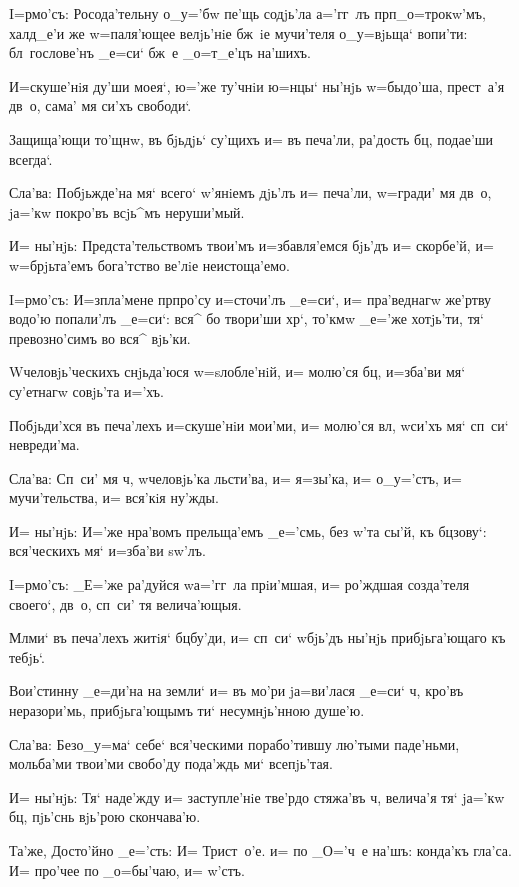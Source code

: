
I=рмо'съ: Росода'тельну о_у='бw пе'щь содjь'ла 
а='гг~лъ прп _о=трокw'мъ, халд_е'и же w=паля'ющее 
велjь'нiе бж~iе мучи'теля о_у=вjьща` вопи'ти: 
бл~гослове'нъ _е=си` бж~е _о=т_е'цъ на'шихъ.

И=скуше'нiя ду'ши моея`, ю='же ту'чнiи ю=нцы` ны'нjь 
w=быдо'ша, прест~а'я дв~о, сама' мя си'хъ свободи`.

Защища'ющи то'щнw, въ бjьдjь` су'щихъ и= въ печа'ли, 
ра'дость бц, подае'ши всегда`.

Сла'ва: Побjьжде'на мя` всего` w'янiемъ дjь'лъ и= 
печа'ли, w=гради' мя дв~о, jа='кw покро'въ всjь^мъ 
неруши'мый.

И= ны'нjь: Предста'тельствомъ твои'мъ и=збавля'емся 
бjь'дъ и= скорбе'й, и= w=брjьта'емъ бога'тство ве'лiе 
неистоща'емо.


I=рмо'съ: И=з\ъ пла'мене прп ро'су и=сточи'лъ 
_е=си`, и= пра'веднагw же'ртву водо'ю попали'лъ _е=си`: 
вся^ бо твори'ши хр`, то'кмw _е='же хотjь'ти, тя` 
превозно'симъ во вся^ вjь'ки.

W\т человjь'ческихъ снjьда'юся w=sлобле'нiй, и= 
молю'ся бц, и=зба'ви мя` су'етнагw совjь'та и='хъ.

Побjьди'хся въ печа'лехъ и=скуше'нiи мои'ми, и= 
молю'ся вл, w\т си'хъ мя` сп~си` невреди'ма.

Сла'ва: Сп~си' мя ч, w\т человjь'ка льсти'ва, и= 
я=зы'ка, и= о_у='стъ, и= мучи'тельства, и= вся'кiя 
ну'жды.

И= ны'нjь: И='же нра'вомъ прельща'емъ _е='смь, без\ъ 
w'та сы'й, къ бц зову`: вся'ческихъ мя` и=зба'ви 
sw'лъ.


I=рмо'съ: _Е='же ра'дуйся w\т а='гг~ла прiи'мшая, и= 
ро'ждшая созда'теля своего`, дв~о, сп~си' тя велича'ющыя.

Мл ми` въ печа'лехъ житiя` бц бу'ди, и= 
сп~си` w\т бjь'дъ ны'нjь прибjьга'ющаго къ тебjь`.

Вои'стинну _е=ди'на на земли` и= въ мо'ри jа=ви'лася 
_е=си` ч, кро'въ неразори'мь, прибjьга'ющымъ ти` 
несумнjь'нною душе'ю.

Сла'ва: Без\ъ о_у=ма` себе` вся'ческими порабо'тившу 
лю'тыми паде'ньми, мольба'ми твои'ми свобо'ду пода'ждь 
ми` всепjь'тая.

И= ны'нjь: Тя` наде'жду и= заступле'нiе тве'рдо 
стяжа'въ ч, велича'я тя` jа='кw бц, пjь'снь 
вjь'рою скончава'ю.

Та'же, Досто'йно _е='сть: И= Трист~о'е. и= по _О='ч~е 
на'шъ: конда'къ гла'са. И= про'чее по _о=бы'чаю, и= 
w'стъ.
